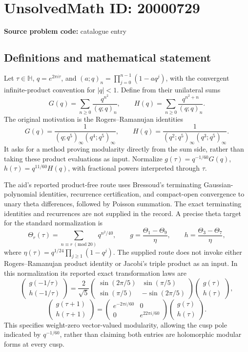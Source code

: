 \documentclass[11pt]{article}
\begin{document}
\section*{UnsolvedMath ID: 20000729}
\textbf{Source problem code:} catalogue entry
\subsection{Definitions and mathematical statement}
Let \(\tau\in\mathbb H\), \(q=e^{2\pi i\tau}\), and \((a;q)_n=\prod_{j=0}^{n-1}(1-aq^j)\), with the convergent infinite-product convention for \(|q|<1\). Define from their unilateral sums
\[
 G(q)=\sum_{n\geq0}\frac{q^{n^2}}{(q;q)_n},\qquad
 H(q)=\sum_{n\geq0}\frac{q^{n^2+n}}{(q;q)_n}.
\]
The original motivation is the Rogers--Ramanujan identities
\[
 G(q)=\frac1{(q;q^5)_\infty(q^4;q^5)_\infty},\qquad
 H(q)=\frac1{(q^2;q^5)_\infty(q^3;q^5)_\infty}.
\]
It asks for a method proving modularity directly from the sum side, rather than taking these product evaluations as input. Normalize \(g(\tau)=q^{-1/60}G(q)\), \(h(\tau)=q^{11/60}H(q)\), with fractional powers interpreted through \(\tau\).

The aid's reported product-free route uses Bressoud's terminating Gaussian-polynomial identities, recurrence certification, and compact-open convergence to unary theta differences, followed by Poisson summation. The exact terminating identities and recurrences are not supplied in the record. A precise theta target for the standard normalization is
\[
 \Theta_r(\tau)=\sum_{n\equiv r\ (\mathrm{mod}\ 20)}q^{n^2/40},\qquad
 g=\frac{\Theta_1-\Theta_9}{\eta},\qquad
 h=\frac{\Theta_3-\Theta_7}{\eta},
\]
where \(\eta(\tau)=q^{1/24}\prod_{j\geq1}(1-q^j)\). The supplied route does not invoke either Rogers--Ramanujan product identity or Jacobi's triple product as an input. In this normalization its reported exact transformation laws are
\[
 \begin{pmatrix}g(-1/\tau)\\h(-1/\tau)\end{pmatrix}
 =\frac2{\sqrt5}\begin{pmatrix}
 \sin(2\pi/5)&\sin(\pi/5)\\
 \sin(\pi/5)&-\sin(2\pi/5)
 \end{pmatrix}\begin{pmatrix}g(\tau)\\h(\tau)\end{pmatrix},
\]
\[
 \begin{pmatrix}g(\tau+1)\\h(\tau+1)\end{pmatrix}
 =\begin{pmatrix}e^{-2\pi i/60}&0\\0&e^{22\pi i/60}\end{pmatrix}
 \begin{pmatrix}g(\tau)\\h(\tau)\end{pmatrix}.
\]
This specifies weight-zero vector-valued modularity, allowing the cusp pole indicated by \(q^{-1/60}\), rather than claiming both entries are holomorphic modular forms at every cusp.
\end{document}
